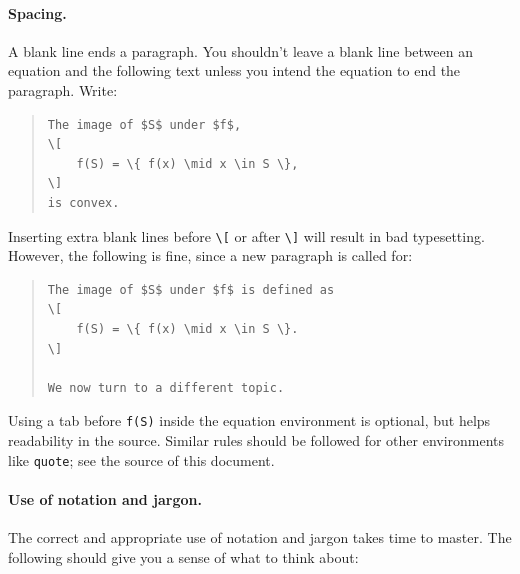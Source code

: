 \documentclass[12pt]{article}
\begin{document}
\paragraph{Spacing.}
A blank line ends a paragraph. You shouldn't leave a blank line between an
equation and the following text unless you intend the equation to end the
paragraph. Write:
\begin{quote}
\begin{verbatim}
The image of $S$ under $f$,
\[
    f(S) = \{ f(x) \mid x \in S \},
\]
is convex.
\end{verbatim}
\end{quote}
Inserting extra blank lines before \verb+\[+ or after \verb+\]+ will result in
bad typesetting. However, the following is fine, since a new paragraph is called for:
\begin{quote}
\begin{verbatim}
The image of $S$ under $f$ is defined as
\[
    f(S) = \{ f(x) \mid x \in S \}.
\]

We now turn to a different topic.
\end{verbatim}
\end{quote}
Using a tab before \verb+f(S)+ inside the equation environment is
optional, but helps readability in the source.  Similar rules should be
followed for other environments like \texttt{quote}; see the source of this
document.

\paragraph{Use of notation and jargon.}
The correct and appropriate use of notation and jargon takes time to master.
The following should give you a sense of what to think about:
\end{document}
